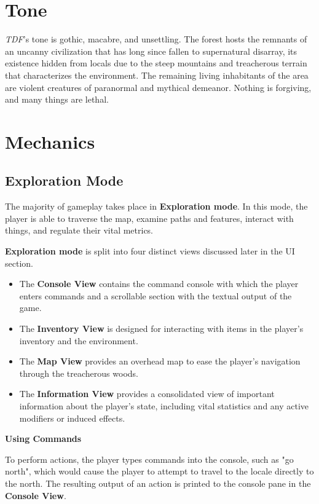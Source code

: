 \documentclass[11pt]{article}
\begin{document}
	\section{Tone}
	
	\textit{TDF}'s tone is gothic, macabre, and unsettling. The forest hosts the remnants of an uncanny civilization that has long since fallen to supernatural disarray, its existence hidden from locals due to the steep mountains and treacherous terrain that characterizes the environment. The remaining living inhabitants of the area are violent creatures of paranormal and mythical demeanor. Nothing is forgiving, and many things are lethal.
	
	\section{Mechanics}
	
	\subsection{Exploration Mode}
	
	The majority of gameplay takes place in \textbf{Exploration mode}. In this mode, the player is able to traverse the map, examine paths and features, interact with things, and regulate their vital metrics.
	
	\textbf{Exploration mode} is split into four distinct views discussed later in the UI section.
	
	\begin{itemize}
		\item The \textbf{Console View} contains the command console with which the player enters commands and a scrollable section with the textual output of the game.
		\item The \textbf{Inventory View} is designed for interacting with items in the player's inventory and the environment.
		\item The \textbf{Map View} provides an overhead map to ease the player's navigation through the treacherous woods.
		\item The \textbf{Information View} provides a consolidated view of important information about the player's state, including vital statistics and any active modifiers or induced effects.
	\end{itemize}

	\textbf{Using Commands}
	\newline
	
	To perform actions, the player types commands into the console, such as "go north", which would cause the player to attempt to travel to the locale directly to the north. The resulting output of an action is printed to the console pane in the \textbf{Console View}.
	
\end{document}

